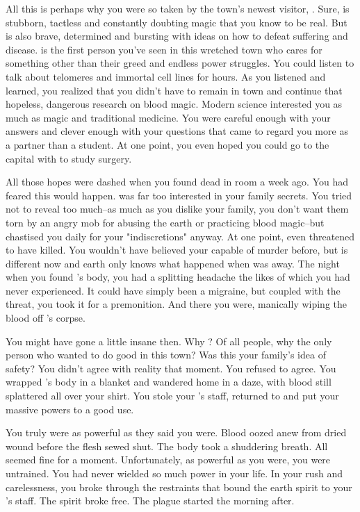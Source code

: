 \documentclass[char]{Pestilence}
\begin{document}
All this is perhaps why you were so taken by the town's newest visitor, \cOutsider{}. Sure, \cOutsider{\they} is stubborn, tactless and constantly doubting magic that you know to be real. But \cOutsider{\they} is also brave, determined and bursting with ideas on how to defeat suffering and disease. \cOutsider{\They} is the first person you've seen in this wretched town who cares for something other than their greed and endless power struggles. You could listen to \cOutsider{\them} talk about telomeres and immortal cell lines for hours. As you listened and learned, you realized that you didn't have to remain in town and continue that hopeless, dangerous research on blood magic. Modern science interested you as much as magic and traditional medicine. You were careful enough with your answers and clever enough with your questions that \cOutsider{} came to regard you more as a partner than a student. At one point, you even hoped you could go to the capital with \cOutsider{\them} to study surgery.

All those hopes were dashed when you found \cOutsider{} dead in \cOutsider{\their} room a week ago. You had feared this would happen. \cOutsider{} was far too interested in your family secrets. You tried not to reveal too much--as much as you dislike your family, you don't want them torn by an angry mob for abusing the earth or practicing blood magic--but \cApprentice{} chastised you daily for your "indiscretions" anyway. At one point, \cApprentice{\they} even threatened to have \cOutsider{} killed. You wouldn't have believed your \cApprentice{\sibling} capable of murder before, but \cApprentice{\they} is different now and earth only knows what happened when \cApprentice{\they} was away. The night when you found \cOutsider{}'s body, you had a splitting headache the likes of which you had never experienced. It could have simply been a migraine, but coupled with the threat, you took it for a premonition. And there you were, manically wiping the blood off \cOutsider{}'s corpse.

You might have gone a little insane then. Why \cOutsider{\them}? Of all people, why the only person who wanted to do good in this town? Was this your family's idea of safety? You didn't agree with reality that moment. You refused to agree. You wrapped \cOutsider{}'s body in a blanket and wandered home in a daze, with blood still splattered all over your shirt. You stole your \cElder{\parent}'s staff, returned to \cOutsider{} and put your massive powers to a good use.

You truly were as powerful as they said you were. Blood oozed anew from dried wound before the flesh sewed shut. The body took a shuddering breath. All seemed fine for a moment. Unfortunately, as powerful as you were, you were untrained. You had never wielded so much power in your life. In your rush and carelessness, you broke through the restraints that bound the earth spirit to your \cElder{\parent}'s staff. The spirit broke free. The plague started the morning after.
\end{document}
